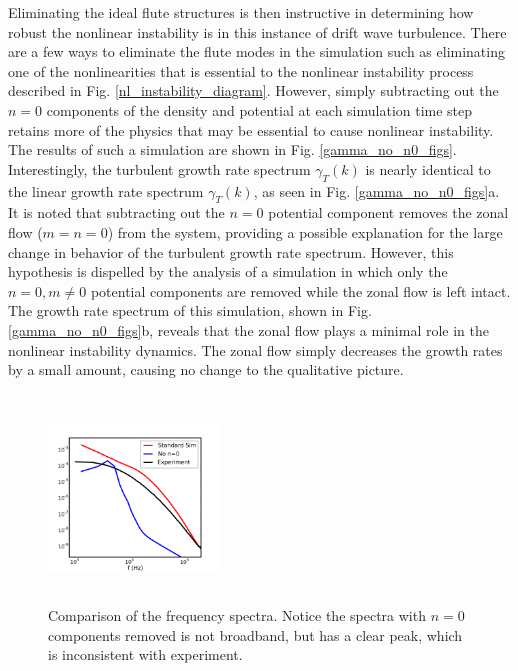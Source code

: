 \documentclass[showpacs,preprintnumbers,amsmath,amssymb,superscriptaddress]{revtex4}
\begin{document}
Eliminating the ideal flute structures is then instructive
in determining how robust the nonlinear instability is in this instance of drift wave turbulence. There are a few ways to eliminate the flute modes in the simulation such as
eliminating one of the nonlinearities that is essential to the nonlinear instability process described in Fig. \ref{nl_instability_diagram}. However, simply subtracting out the $n=0$
components of the density and potential at each simulation time step retains more of the physics that may be essential to cause nonlinear instability. The results of such a simulation
are shown in Fig. \ref{gamma_no_n0_figs}. Interestingly, the turbulent growth rate spectrum $\gamma_T(k)$ is nearly identical to the linear growth rate spectrum $\gamma_T(k)$, as seen in
Fig. \ref{gamma_no_n0_figs}a. It is noted that subtracting out the $n=0$ potential component removes the zonal flow ($m=n=0$) from the system, providing a possible explanation for the large change
in behavior of the turbulent growth rate spectrum. However, this hypothesis is dispelled by the analysis of a simulation in which only the $n=0, m \ne 0$ potential components are removed while 
the zonal flow is left intact. The growth rate spectrum of this simulation, shown in Fig. \ref{gamma_no_n0_figs}b, reveals that the zonal flow plays a minimal role in the nonlinear instability
dynamics. The zonal flow simply decreases the growth rates by a small amount, causing no change to the qualitative picture. 

\begin{figure}
\includegraphics[width=0.40\textwidth,height=55mm]{fspec_3}
\hfil
\caption{Comparison of the frequency spectra. Notice the spectra with $n=0$ components removed is not broadband, but has a clear peak, which is inconsistent with experiment.}
\label{freq_spectra3}
\end{figure}
\end{document}
